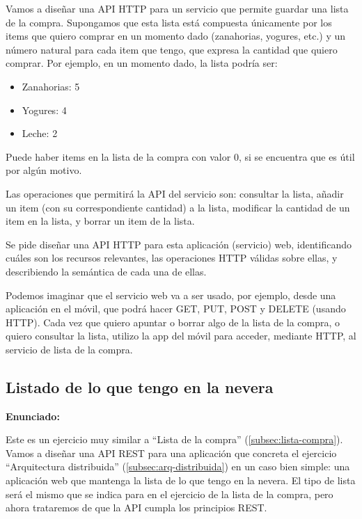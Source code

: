 Vamos a diseñar una API HTTP para un servicio que permite guardar una lista de la compra. Supongamos que esta lista está compuesta únicamente por los items que quiero comprar en un momento dado (zanahorias, yogures, etc.) y un número natural para cada item que tengo, que expresa la cantidad que quiero comprar. Por ejemplo, en un momento dado, la lista podría ser:

\begin{itemize}
\item Zanahorias: 5
\item Yogures: 4
\item Leche: 2
\end{itemize}

Puede haber items en la lista de la compra con valor 0, si se encuentra que es útil por algún motivo.

Las operaciones que permitirá la API del servicio son: consultar la lista, añadir un item (con su correspondiente cantidad) a la lista, modificar la cantidad de un item en la lista, y borrar un item de la lista.

Se pide diseñar una API HTTP para esta aplicación (servicio) web, identificando cuáles son los recursos relevantes, las operaciones HTTP válidas sobre ellas, y describiendo la semántica de cada una de ellas.

Podemos imaginar que el servicio web va a ser usado, por ejemplo, desde una aplicación en el móvil, que podrá hacer GET, PUT, POST y DELETE (usando HTTP). Cada vez que quiero apuntar o borrar algo de la lista de la compra, o quiero consultar la lista, utilizo la app del móvil para acceder, mediante HTTP, al servicio de lista de la compra.

\subsection{Listado de lo que tengo en la nevera}
\label{subsec:contenido-nevera}

\textbf{Enunciado:}

Este es un ejercicio muy similar a ``Lista de la compra'' (\ref{subsec:lista-compra}). Vamos a diseñar una API REST para una aplicación que concreta el ejercicio ``Arquitectura distribuida'' (\ref{subsec:arq-distribuida}) en un caso bien simple: una aplicación web que mantenga la lista de lo que tengo en la nevera. El tipo de lista será el mismo que se indica para en el ejercicio de la lista de la compra, pero ahora trataremos de que la API cumpla los principios REST.

